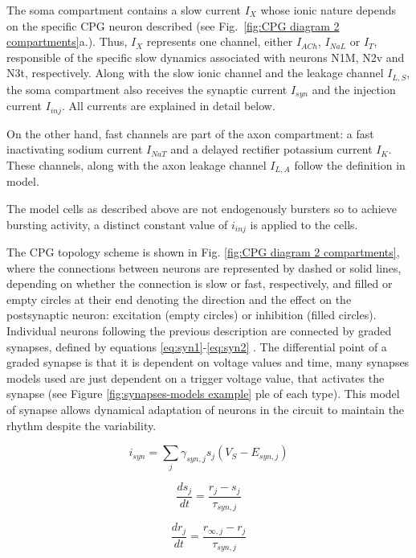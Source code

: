 The soma compartment contains a slow current $I_X$ whose ionic nature depends on the specific CPG neuron described (see Fig.~\ref{fig:CPG diagram 2 compartments}a.). Thus, $I_X$  represents one channel, either $I_{ACh}$, $I_{NaL}$ or $I_{T}$, responsible of the specific slow dynamics associated with neurons N1M, N2v and N3t, respectively.  Along with the slow ionic channel and the leakage channel  $I_{L,S}$, the soma compartment also receives the synaptic current $I_{syn}$ and the injection current $I_{inj}$. All currents are explained in detail below.

On the other hand, fast channels are part of the axon compartment: a fast inactivating sodium current $I_{NaT}$ and a delayed rectifier potassium current $I_{K}$. These channels, along with the axon leakage channel  $I_{L,A}$ follow the definition in \cite{HODGKIN1952} model.

The model cells as described above are not endogenously bursters so to achieve bursting activity, a distinct constant value of  \(i_{inj}\) is applied to the cells. 

The CPG topology scheme is shown in Fig. \ref{fig:CPG diagram 2 compartments}, where the connections between neurons are represented by dashed or solid lines, depending on whether the connection is slow or fast, respectively, and filled or empty circles at their end denoting the direction and the effect on the postsynaptic neuron: excitation (empty circles) or inhibition (filled circles).
Individual neurons following the previous description are connected by graded synapses, defined by equations \ref{eq:syn1}-\ref{eq:syn2} \parencite{Vavoulis2007}. The differential point of a graded synapse is that it is dependent on voltage values and time, many synapses models used are just dependent on a trigger voltage value, that activates the synapse (see Figure \ref{fig:synapses-models example} ple of each type). This model of synapse allows dynamical adaptation of neurons in the circuit to maintain the rhythm despite the variability. 

\begin{equation}
	i_{syn} = \sum_j \gamma_{syn,j} s_j (V_S - E_{syn,j})
	\label{eq:syn1}
\end{equation}

\begin{equation}
	\frac{ds_j}{dt} = \frac{r_{j}-s_j}{\tau_{syn,j}}
\end{equation}

\begin{equation}
	\frac{dr_j}{dt} = \frac{r_{\infty,j}-r_j}{\tau_{syn,j}}
\end{equation}

